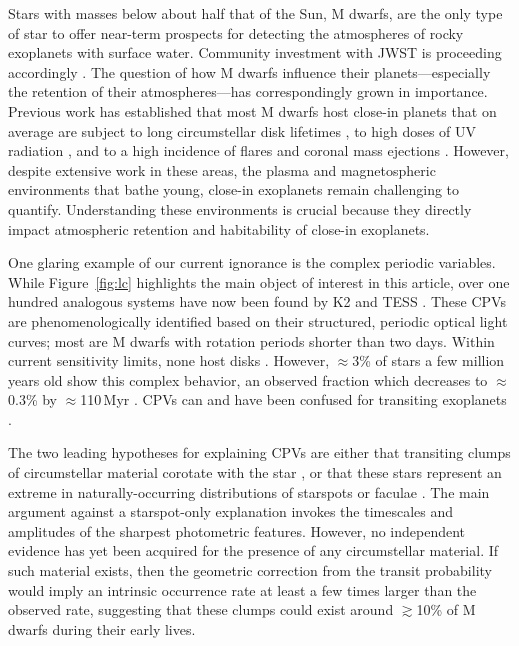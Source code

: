 \documentclass[11pt,twocolumn,tighten,linenumbers]{aastex7}
\begin{document}
Stars with masses below about half that of the Sun, M dwarfs, are the
only type of star to offer near-term prospects for detecting the
atmospheres of rocky exoplanets with surface water.  Community
investment with JWST is proceeding accordingly
\citep[][]{Redfield2024,TRAPPIST1JWSTCommunityInitiative2024}.  The
question of how M dwarfs influence their planets---especially the
retention of their atmospheres---has correspondingly grown in
importance.  Previous work has established
that most M dwarfs host close-in planets \citep{Dressing2015} that on
average are subject to long circumstellar disk lifetimes
\citep{Ribas2015}, to high doses of UV radiation \citep{France2016},
and to a high incidence of flares and coronal mass ejections
\citep{Feinstein2020}.  However, despite extensive work in these
areas, the plasma and magnetospheric environments that bathe young,
close-in exoplanets remain challenging to quantify.  Understanding
these environments is crucial because they directly impact atmospheric
retention and habitability of close-in exoplanets.

One glaring example of our current ignorance is the complex periodic
variables.  While Figure~\ref{fig:lc} highlights the main
object of interest in this article, over one hundred analogous systems
have now been found by K2 and TESS
\citep{Rebull2016,Stauffer2017,Rebull2018,Zhan2019,Rebull2020,Stauffer2021,Popinchalk2023,Bouma2024}.
These CPVs are phenomenologically identified based on their
structured, periodic optical light curves; most are M dwarfs with
rotation periods shorter than two days.  Within current sensitivity
limits, none host disks \citep{Stauffer2017,Bouma2024}.  However,
$\approx$3\% of stars a few million years old show this complex
behavior, an observed fraction which decreases to
$\approx$0.3\% by $\approx$110\,Myr \citep{Rebull2020}.  CPVs can and
have been confused for transiting exoplanets
\citep{vanEyken2012,Johns-Krull2016,Bouma2020}.

The two leading hypotheses for explaining CPVs are either that
transiting clumps of circumstellar material corotate with the star
\citep{Stauffer2017,Gunther2022,Bouma2024}, or that these stars
represent an extreme in naturally-occurring distributions of starspots
or faculae \citep{Koen2021}.  The main argument against a
starspot-only explanation invokes the timescales and amplitudes of the
sharpest photometric features.  However, no independent evidence has
yet been acquired for the presence of any circumstellar material.  If
such material exists, then the geometric correction from the transit
probability would imply an intrinsic occurrence rate at least a few
times larger than the observed rate, suggesting that these clumps
could exist around $\gtrsim$10\% of M dwarfs during their early lives.
\end{document}
